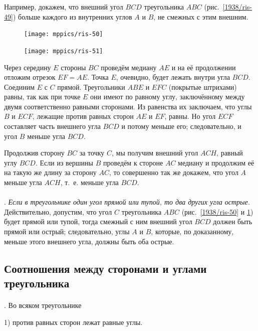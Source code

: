 \documentclass[oneside]{book}
\begin{document}
Например, докажем, что внешний угол $BCD$ треугольника $ABC$
(рис.~\ref{1938/ris-49}) больше каждого из внутренних углов $A$ и $B$, не смежных с этим внешним.

\begin{figure}
\centering
\texttt{[image: mppics/ris-50]}
\caption{}\label{1938/ris-50}
\centering
\texttt{[image: mppics/ris-51]}
\caption{}\label{1938/ris-51}
\end{figure}

Через середину $E$ стороны $BC$ проведём медиану $AE$ и на её продолжении отложим отрезок $EF=AE$.
Точка $E$, очевидно, будет лежать внутри угла $BCD$.
Соединим $E$ с $C$ прямой.
Треугольники $ABE$ и $EFC$ (покрытые штрихами) равны, так как при точке $E$ они имеют по равному углу, заключённому между двумя соответственно равными сторонами.
Из равенства их заключаем, что углы $B$ и $ECF$, лежащие против равных сторон $AE$ и $EF$, равны.
Но угол $ECF$ составляет часть внешнего угла $BCD$ и потому меньше его;
следовательно, и угол $B$ меньше угла $BCD$.

Продолжив сторону $BC$ за точку $C$, мы получим внешний угол $ACH$, равный углу $BCD$.
Если из вершины $B$ проведём к стороне $AC$ медиану и продолжим её на такую же длину за сторону $AC$, то совершенно так же докажем, что угол $A$ меньше угла $ACH$, т.~е. меньше угла $BCD$.

\paragraph{}\label{1938/45}
\mbox{.}
\emph{Если в треугольнике один угол прямой или тупой, то два других угла острые.}
Действительно, допустим, что угол $C$ треугольника $ABC$ 
(рис.~\ref{1938/ris-50} и \ref{1938/ris-51}) будет прямой или тупой, тогда смежный с ним внешний угол $BCD$ должен быть прямой или острый;
следовательно, углы $A$ и $B$, которые, по доказанному, меньше этого внешнего угла, должны быть оба острые.

\subsection*{Соотношения между сторонами и углами треугольника}

\paragraph{}\label{1938/46}
.
Во всяком треугольнике

1) против равных сторон лежат равные углы.
\end{document}
